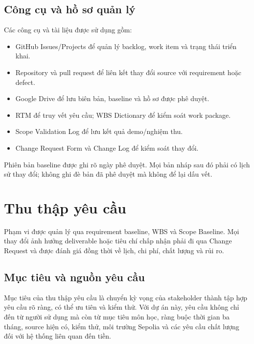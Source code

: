 \subsection{Công cụ và hồ sơ quản lý}

Các công cụ và tài liệu được sử dụng gồm:

\begin{itemize}
  \item GitHub Issues/Projects để quản lý backlog, work item và trạng thái triển khai.
  \item Repository và pull request để liên kết thay đổi source với requirement hoặc defect.
  \item Google Drive để lưu biên bản, baseline và hồ sơ được phê duyệt.
  \item RTM để truy vết yêu cầu; WBS Dictionary để kiểm soát work package.
  \item Scope Validation Log để lưu kết quả demo/nghiệm thu.
  \item Change Request Form và Change Log để kiểm soát thay đổi.
\end{itemize}

Phiên bản baseline được ghi rõ ngày phê duyệt. Mọi bản nháp sau đó phải có lịch sử thay đổi; không ghi đè bản đã phê duyệt mà không để lại dấu vết.

\fi
\section{Thu thập yêu cầu}

Phạm vi được quản lý qua requirement baseline, WBS và Scope Baseline. Mọi thay đổi ảnh hưởng deliverable hoặc tiêu chí chấp nhận phải đi qua Change Request và được đánh giá đồng thời về lịch, chi phí, chất lượng và rủi ro.

\iffalse
\subsection{Mục tiêu và nguồn yêu cầu}

Mục tiêu của thu thập yêu cầu là chuyển kỳ vọng của stakeholder thành tập hợp yêu cầu rõ ràng, có thể ưu tiên và kiểm thử. Với dự án này, yêu cầu không chỉ đến từ người sử dụng mà còn từ mục tiêu môn học, ràng buộc thời gian ba tháng, source hiện có, kiểm thử, môi trường Sepolia và các yêu cầu chất lượng đối với hệ thống liên quan đến tiền.

